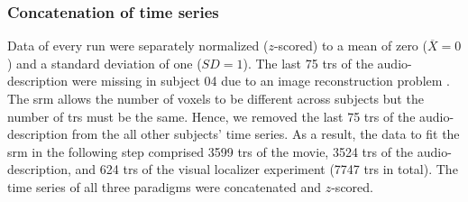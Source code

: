\begin{comment}

The number of remaining voxels per subject can be seen in Table
\ref{tab:ppamaskvoxels} (range 1369--1951, $\overline{X}=1592$, $SD=188$).


\begin{table*}[btp]
\caption{
%
\textbf{Table heading.}
%
Number of remaining voxels after time series data of each paradigm
and subject were masked with the union of individual \acp{ppa} that was
warped from MNI space into each individual's subjects-space and the
subject-specific field of view of audio-description.}

\label{tab:ppamaskvoxels}
\begin{tabular}{ll}
\toprule
\textbf{Subject} & \textbf{no. of voxels} \\
\midrule
sub-01 & 1665 \tabularnewline
sub-02 & 1732 \tabularnewline
sub-03 & 1400 \tabularnewline
sub-04 & 1575 \tabularnewline
sub-05 & 1664 \tabularnewline
sub-06 & 1951 \tabularnewline
sub-14 & 1376 \tabularnewline
sub-09 & 1383 \tabularnewline
sub-15 & 1683 \tabularnewline
sub-16 & 1887 \tabularnewline
sub-17 & 1441 \tabularnewline
sub-18 & 1729 \tabularnewline
sub-19 & 1369 \tabularnewline
sub-20 & 1437 \tabularnewline
\bottomrule
\end{tabular}
\caption*{The legend text goes here.}
\end{table*}

\end{comment}



\subsubsection{Concatenation of time series}



Data of every run were separately normalized ($z$-scored) to a mean of zero
($\overline{X}=0$) and a standard deviation of one ($SD=1$).
%
The last 75 \acp{tr} of the audio-description were missing in subject 04 due to
an image reconstruction problem \citep[s.][]{hanke2014audiomovie}.
%
The \ac{srm} allows the number of voxels to be different across subjects but the
number of \acp{tr} must be the same.
%
Hence, we removed the last 75 \acp{tr} of the audio-description from the all
other subjects' time series.
As a result, the data to fit the \ac{srm} in the following step comprised 3599
\acp{tr} of the movie, 3524 \acp{tr} of the audio-description, and 624 \acp{tr}
of the visual localizer experiment (7747 \acp{tr} in total).
The time series of all three paradigms were concatenated and $z$-scored.



